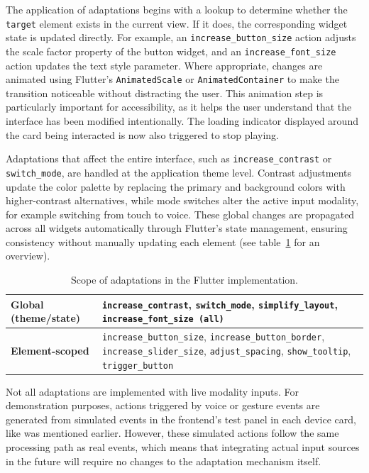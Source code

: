 The application of adaptations begins with a lookup to determine whether the \texttt{target} element exists in the current view. If it does, the corresponding widget state is updated directly. For example, an \texttt{increase\_button\_size} action adjusts the scale factor property of the button widget, and an \texttt{increase\_font\_size} action updates the text style parameter. Where appropriate, changes are animated using Flutter’s \texttt{AnimatedScale} or \texttt{AnimatedContainer} to make the transition noticeable without distracting the user. This animation step is particularly important for accessibility, as it helps the user understand that the interface has been modified intentionally. The loading indicator displayed around the card being interacted is now also triggered to stop playing.

Adaptations that affect the entire interface, such as \texttt{increase\_contrast} or \texttt{switch\_mode}, are handled at the application theme level. Contrast adjustments update the color palette by replacing the primary and background colors with higher-contrast alternatives, while mode switches alter the active input modality, for example switching from touch to voice. These global changes are propagated across all widgets automatically through Flutter’s state management, ensuring consistency without manually updating each element (see table~\ref{tab:adaptation-scope} for an overview).

\begin{table}[H]
\centering
\caption{Scope of adaptations in the Flutter implementation.}
\begin{tabular}{lp{9cm}}
\toprule
\textbf{Global (theme/state)} & \texttt{increase\_contrast}, \texttt{switch\_mode}, \texttt{simplify\_layout}, \texttt{increase\_font\_size (all)} \\
\midrule
\textbf{Element-scoped} & \texttt{increase\_button\_size}, \texttt{increase\_button\_border}, \texttt{increase\_slider\_size}, \texttt{adjust\_spacing}, \texttt{show\_tooltip}, \texttt{trigger\_button} \\
\bottomrule
\end{tabular}
\label{tab:adaptation-scope}
\end{table}

Not all adaptations are implemented with live modality inputs. For demonstration purposes, actions triggered by voice or gesture events are generated from simulated events in the frontend’s test panel in each device card, like was mentioned earlier. However, these simulated actions follow the same processing path as real events, which means that integrating actual input sources in the future will require no changes to the adaptation mechanism itself.

